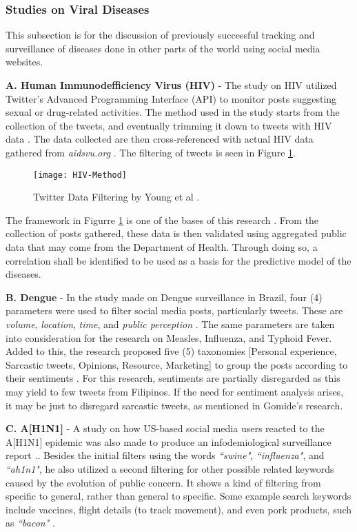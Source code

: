 \subsubsection{Studies on Viral Diseases}
This subsection is for the discussion of previously successful tracking and surveillance of diseases done in other parts of the world using social media websites.

\textbf{A. Human Immunodefficiency Virus (HIV)} - The study on HIV utilized Twitter's Advanced Programming Interface (API) to monitor posts suggesting sexual or drug-related activities. The method used in the study starts from the collection of the tweets, and eventually trimming it down to tweets with HIV data \cite{Young:2014aa}. The data collected are then cross-referenced with actual HIV data gathered from \textit{aidsvu.org} \cite{Young:2014aa}. The filtering of tweets is seen in Figure \ref{fig:HIV-Method}.
\begin{figure}[H]
    \centering
    \texttt{[image: HIV-Method]}
	\caption{Twitter Data Filtering by Young et al \cite{Young:2014aa}.}
	\label{fig:HIV-Method}
\end{figure}

The framework in Figurre \ref{fig:HIV-Method} is one of the bases of this research \cite{Young:2014aa}. From the collection of posts gathered, these data is then validated using aggregated public data that may come  from the Department of Health. Through doing so, a correlation shall be identified to be used as a basis for the predictive model of the diseases.

\textbf{B. Dengue} - In the study made on Dengue surveillance in Brazil, four (4) parameters were used to filter social media posts, particularly tweets. These are \textit{volume}, \textit{location}, \textit{time}, and \textit{public perception} \cite{gomide2011dengue}. The same parameters are taken into consideration for the research on Measles, Influenza, and Typhoid Fever. Added to this, the research proposed five (5) taxonomies [Personal experience, Sarcastic tweets, Opinions, Resource, Marketing] to group the posts according to their sentiments  \cite{gomide2011dengue}. For this research, sentiments are partially disregarded as this may yield to few tweets from Filipinos. If the need for sentiment analysis arises, it may be just to disregard sarcastic tweets, as mentioned in Gomide's research.

\textbf{C. A[H1N1]} - A study on how US-based social media users reacted to the A[H1N1] epidemic was also made to produce an infodemiological surveillance report \cite{Signorini:2011aa}.. Besides the initial filters using the words \textit{``swine"}, \textit{``influenza"}, and \textit{``ah1n1"}, he also utilized a second filtering for other possible related keywords caused by the evolution of public concern. It shows a kind of filtering from specific to general, rather than general to specific. Some example search keywords include vaccines, flight details (to track movement), and even pork products, such as \textit{``bacon"} \cite{Signorini:2011aa}.